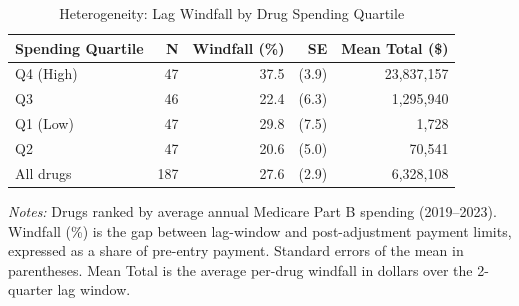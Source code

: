 \begin{table}[ht]
\centering
\begin{threeparttable}
\caption{Heterogeneity: Lag Windfall by Drug Spending Quartile}
\label{tab:heterogeneity}
\begin{tabular}{lrrrr}
\toprule
Spending Quartile & N & Windfall (\%) & SE & Mean Total (\$) \\
\midrule
Q4 (High) & 47 & 37.5 & (3.9) & 23,837,157 \\
Q3 & 46 & 22.4 & (6.3) & 1,295,940 \\
Q1 (Low) & 47 & 29.8 & (7.5) & 1,728 \\
Q2 & 47 & 20.6 & (5.0) & 70,541 \\
\midrule
All drugs & 187 & 27.6 & (2.9) & 6,328,108 \\
\bottomrule
\end{tabular}
\begin{tablenotes}[flushleft]\footnotesize
\item \textit{Notes:} Drugs ranked by average annual Medicare Part B spending (2019--2023). Windfall (\%) is the gap between lag-window and post-adjustment payment limits, expressed as a share of pre-entry payment. Standard errors of the mean in parentheses. Mean Total is the average per-drug windfall in dollars over the 2-quarter lag window.
\end{tablenotes}
\end{threeparttable}
\end{table}


